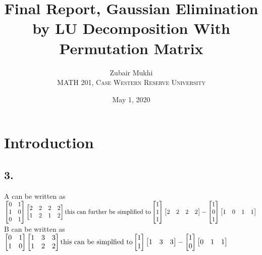 \documentclass{article}
\title{Final Report, Gaussian Elimination by LU Decomposition With Permutation Matrix}
\author{Zubair Mukhi\\
MATH 201, \textsc{Case Western Reserve University}
}
\date{May 1, 2020}
\begin{document}
\maketitle
\tableofcontents
\section{Introduction}



\subsection*{3.}
A can be written as\\
\begin{math}
\begin{bmatrix}0&1\\1&0\\0&1\end{bmatrix}\begin{bmatrix}2&2&2&2\\1&2&1&2\end{bmatrix}\\
\text{this can further be simplified to}\\
\begin{bmatrix}1\\1\\1\end{bmatrix}\begin{bmatrix}2&2&2&2\end{bmatrix}
-\begin{bmatrix}1\\0\\1\end{bmatrix}\begin{bmatrix}1&0&1&1\end{bmatrix}\\
\end{math}\\
B can be written as\\
\begin{math}
\begin{bmatrix}0&1\\1&0\end{bmatrix}\begin{bmatrix}1&3&3\\1&2&2\end{bmatrix}\\
\text{this can be simplfied to}\\
\begin{bmatrix}1\\1\end{bmatrix}\begin{bmatrix}1&3&3\end{bmatrix}-\begin{bmatrix}1\\0\end{bmatrix}\begin{bmatrix}0&1&1\end{bmatrix}
\end{math}
\end{document}
